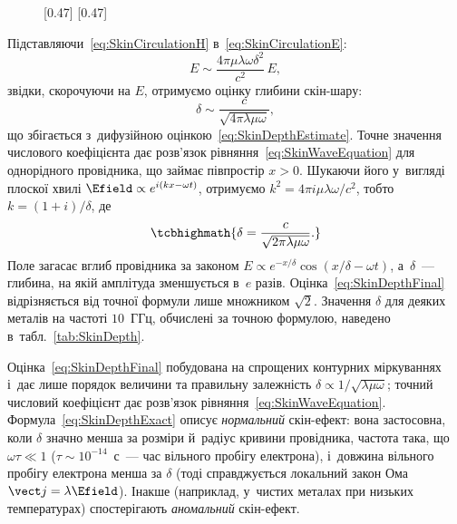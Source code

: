 \begin{figure}[htbp]
	\centering
	[0.47\textwidth]{%
	}\hfill
	[0.47\textwidth]{%
	}
\end{figure}

Підставляючи~\eqref{eq:SkinCirculationH} в~\eqref{eq:SkinCirculationE}:
\begin{equation*}
	E \sim \frac{4\pi\mu\lambda\omega\delta^2}{c^2}\, E,
\end{equation*}
звідки, скорочуючи на $E$, отримуємо оцінку глибини скін-шару:
\begin{equation}\label{eq:SkinDepthFinal}
	\delta \sim \frac{c}{\sqrt{4\pi\lambda\mu\omega}},
\end{equation}
що збігається з~дифузійною оцінкою~\eqref{eq:SkinDepthEstimate}. Точне значення числового коефіцієнта дає розв'язок рівняння~\eqref{eq:SkinWaveEquation} для однорідного провідника, що займає півпростір $x>0$. Шукаючи його у~вигляді плоскої хвилі $\Efield\propto e^{i(kx-\omega t)}$, отримуємо $k^2=4\pi i\mu\lambda\omega/c^2$, тобто $k=(1+i)/\delta$, де
\begin{equation}\label{eq:SkinDepthExact}
	\tcbhighmath{
		\delta = \frac{c}{\sqrt{2\pi\lambda\mu\omega}}.
	}
\end{equation}
Поле загасає вглиб провідника за законом $E\propto e^{-x/\delta}\cos(x/\delta-\omega t)$, а~$\delta$~--- глибина, на якій амплітуда зменшується в~$e$ разів. Оцінка~\eqref{eq:SkinDepthFinal} відрізняється від точної формули лише множником $\sqrt2$.
Значення $\delta$ для деяких металів на частоті $10$~ГГц, обчислені за точною формулою,
наведено в~табл.~\ref{tab:SkinDepth}.

\begin{Attention}[unbreakable]
	Оцінка~\eqref{eq:SkinDepthFinal} побудована на спрощених контурних міркуваннях і~дає
	лише порядок величини та правильну залежність
	$\delta\propto1/\sqrt{\lambda\mu\omega}$; точний числовий коефіцієнт дає розв'язок
	рівняння~\eqref{eq:SkinWaveEquation}. Формула~\eqref{eq:SkinDepthExact}
	описує \emph{нормальний} скін-ефект: вона застосовна, коли $\delta$ значно менша за
	розміри й~радіус кривини провідника, частота така, що $\omega\tau\ll1$ ($\tau\sim10^{-14}$~с~--- час вільного пробігу електрона), і~довжина
	вільного пробігу електрона менша за $\delta$ (тоді справджується локальний закон Ома
	$\vect j=\lambda\Efield$). Інакше (наприклад, у~чистих металах при низьких
	температурах) спостерігають \emph{аномальний} скін-ефект.
\end{Attention}

